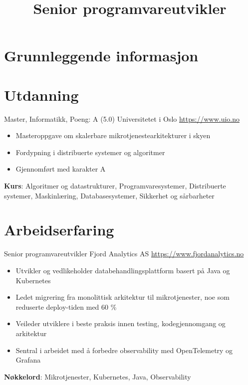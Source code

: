 \documentclass[a4paper, serif, 10pt]{moderncv}
\title{Senior programvareutvikler}
\begin{document}
\maketitle

\section{Grunnleggende informasjon}

\section{Utdanning}

        {Master, Informatikk, Poeng: A (5.0)}
        {Universitetet i Oslo}
        {\url{https://www.uio.no}}
        {}
        {\begin{itemize}
\item Masteroppgave om skalerbare mikrotjenestearkitekturer i skyen
\item Fordypning i distribuerte systemer og algoritmer
\item Gjennomført med karakter A
\end{itemize}
\textbf{Kurs}: Algoritmer og datastrukturer, Programvaresystemer, Distribuerte systemer, Maskinlæring, Databasesystemer, Sikkerhet og sårbarheter}
\section{Arbeidserfaring}

        {Senior programvareutvikler}
        {Fjord Analytics AS}
        {\url{https://www.fjordanalytics.no}}
        {}
        {\begin{itemize}
\item Utvikler og vedlikeholder databehandlingsplattform basert på Java og Kubernetes
\item Ledet migrering fra monolittisk arkitektur til mikrotjenester, noe som reduserte deploy-tiden med 60 \%
\item Veileder utviklere i beste praksis innen testing, kodegjennomgang og arkitektur
\item Sentral i arbeidet med å forbedre observability med OpenTelemetry og Grafana
\end{itemize}
\textbf{Nøkkelord}: Mikrotjenester, Kubernetes, Java, Observability}
\end{document}
